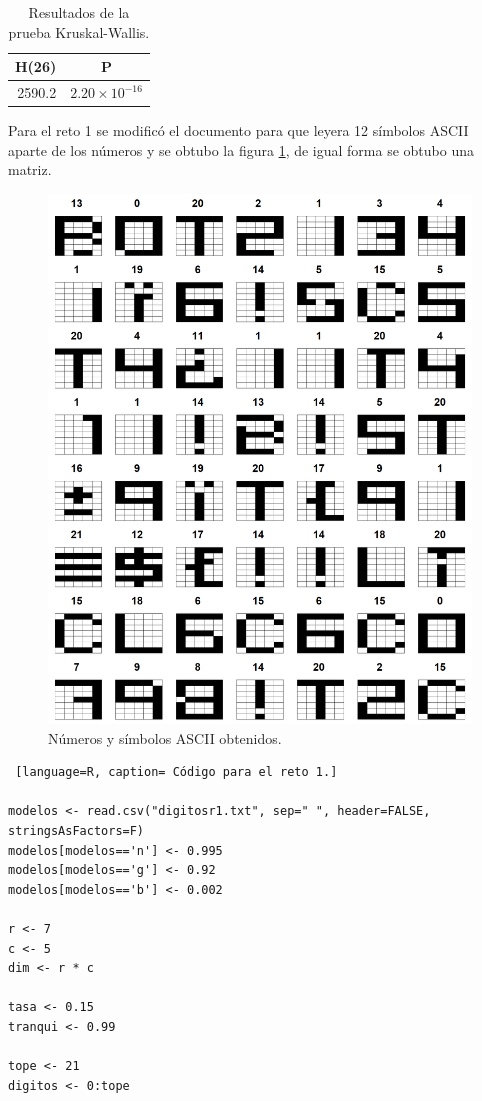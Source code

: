 \documentclass{article}
\begin{document}
\begin{table}[h!]
\centering
\caption{Resultados de la prueba Kruskal-Wallis.}
\label{tabla6}
\begin{tabular}{|c|c|}
\hline
\textbf{H(26)} & \textbf{P} \\ \hline
\multicolumn{1}{|r|}{2590.2} & \multicolumn{1}{r|}{$2.20\times 10^{-16}$} \\ \hline
\end{tabular}
\end{table}

Para el reto 1 se modificó el documento para que leyera 12 símbolos ASCII aparte de los números y se obtubo la figura \ref{grafica2}, de igual forma se obtubo una matriz.
\newpage

\begin{figure} [h!]%
    \centering
    \caption{ Números y símbolos ASCII obtenidos.}
    \label{grafica2}
    \includegraphics[width=150mm]{p12g.png} %
\end{figure}

\begin{lstlisting} [language=R, caption= Código para el reto 1.]

modelos <- read.csv("digitosr1.txt", sep=" ", header=FALSE, stringsAsFactors=F)
modelos[modelos=='n'] <- 0.995
modelos[modelos=='g'] <- 0.92
modelos[modelos=='b'] <- 0.002

r <- 7
c <- 5
dim <- r * c

tasa <- 0.15
tranqui <- 0.99

tope <- 21
digitos <- 0:tope
\end{lstlisting}
\end{document}

